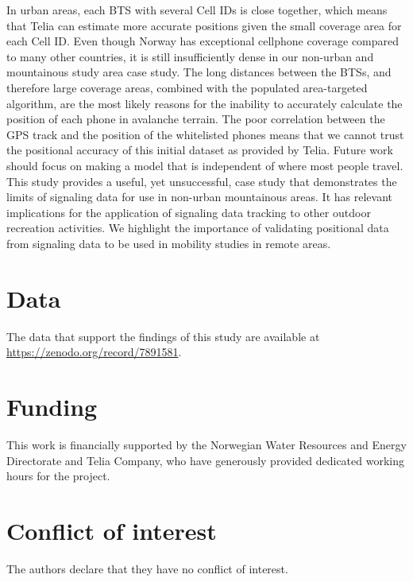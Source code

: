 \documentclass[authordate,empirical, issue]{jote-new-article}
\begin{document}
In urban areas, each BTS with several Cell IDs is close together, which means that Telia can estimate more accurate positions given the small coverage area for each Cell ID. Even though Norway has exceptional cellphone coverage compared to many other countries, it is still insufficiently dense in our non-urban and mountainous study area case study. The long distances between the BTSs, and therefore large coverage areas, combined with the populated area-targeted algorithm, are the most likely reasons for the inability to accurately calculate the position of each phone in avalanche terrain. The poor correlation between the GPS track and the position of the whitelisted phones means that we cannot trust the positional accuracy of this initial dataset as provided by Telia. Future work should focus on making a model that is independent of where most people travel. This study provides a useful, yet unsuccessful, case study that demonstrates the limits of signaling data for use in non-urban mountainous areas. It has relevant implications for the application of signaling data tracking to other outdoor recreation activities. We highlight the importance of validating positional data from signaling data to be used in mobility studies in remote areas.




\section{Data}

The data that support the findings of this study are available at \url{https://zenodo.org/record/7891581}.


\section{Funding}
This work is financially supported by the Norwegian Water Resources and Energy Directorate and Telia Company, who have generously provided dedicated working hours for the project.

\section{Conflict of interest}
The authors declare that they have no conflict of interest.


\printbibliography
\end{document}
